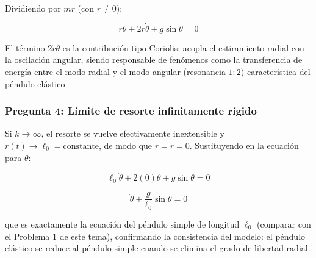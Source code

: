 \begin{sol}
Dividiendo por $mr$ (con $r\neq0$):

$$\boxed{r\ddot\theta + 2\dot{r}\dot\theta + g\sin\theta = 0}$$

El término $2\dot r\dot\theta$ es la contribución tipo Coriolis: acopla el estiramiento radial con la oscilación angular, siendo responsable de fenómenos como la transferencia de energía entre el modo radial y el modo angular (resonancia $1{:}2$) característica del péndulo elástico.

\subsubsection*{Pregunta 4: Límite de resorte infinitamente rígido}

Si $k\to\infty$, el resorte se vuelve efectivamente inextensible y $r(t) \to \ell_0 = \text{constante}$, de modo que $\dot{r}=\ddot{r}=0$. Sustituyendo en la ecuación para $\theta$:

$$\ell_0\ddot\theta + 2(0)\dot\theta + g\sin\theta = 0$$

$$\boxed{\ddot\theta + \frac{g}{\ell_0}\sin\theta = 0}$$

que es exactamente la ecuación del péndulo simple de longitud $\ell_0$ (comparar con el Problema 1 de este tema), confirmando la consistencia del modelo: el péndulo elástico se reduce al péndulo simple cuando se elimina el grado de libertad radial.

\end{sol}
